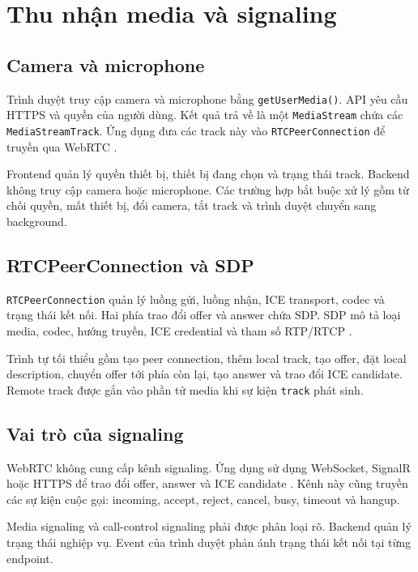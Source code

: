 \section{Thu nhận media và signaling}

\subsection{Camera và microphone}

Trình duyệt truy cập camera và microphone bằng \texttt{getUserMedia()}. API yêu cầu
HTTPS và quyền của người dùng. Kết quả trả về là một \texttt{MediaStream} chứa các
\texttt{MediaStreamTrack}. Ứng dụng đưa các track này vào
\texttt{RTCPeerConnection} để truyền qua WebRTC \cite{w3c-mediacapture,w3c-webrtc}.

Frontend quản lý quyền thiết bị, thiết bị đang chọn và trạng thái track. Backend không
truy cập camera hoặc microphone. Các trường hợp bắt buộc xử lý gồm từ chối quyền, mất
thiết bị, đổi camera, tắt track và trình duyệt chuyển sang background.

\subsection{RTCPeerConnection và SDP}

\texttt{RTCPeerConnection} quản lý luồng gửi, luồng nhận, ICE transport, codec và trạng
thái kết nối. Hai phía trao đổi offer và answer chứa SDP. SDP mô tả loại media, codec,
hướng truyền, ICE credential và tham số RTP/RTCP \cite{rfc9429}.

Trình tự tối thiểu gồm tạo peer connection, thêm local track, tạo offer, đặt local
description, chuyển offer tới phía còn lại, tạo answer và trao đổi ICE candidate. Remote
track được gắn vào phần tử media khi sự kiện \texttt{track} phát sinh.

\subsection{Vai trò của signaling}

WebRTC không cung cấp kênh signaling. Ứng dụng sử dụng WebSocket, SignalR hoặc HTTPS để
trao đổi offer, answer và ICE candidate \cite{rfc8825}. Kênh này cũng truyền các sự kiện
cuộc gọi: incoming, accept, reject, cancel, busy, timeout và hangup.

Media signaling và call-control signaling phải được phân loại rõ. Backend quản lý trạng
thái nghiệp vụ. Event của trình duyệt phản ánh trạng thái kết nối tại từng endpoint.
